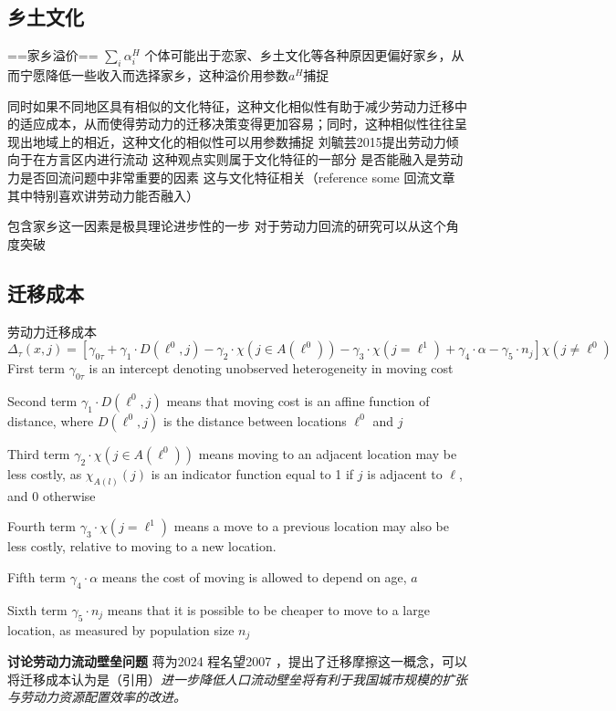 \documentclass[10pt,a4paper]{article}
\begin{document}
\subsection{乡土文化}
==家乡溢价== $\sum\limits_{i}\alpha^{H}_{i}$
个体可能出于恋家、乡土文化等各种原因更偏好家乡，从而宁愿降低一些收入而选择家乡，这种溢价用参数$a^H$捕捉

同时如果不同地区具有相似的文化特征，这种文化相似性有助于减少劳动力迁移中的适应成本，从而使得劳动力的迁移决策变得更加容易；同时，这种相似性往往呈现出地域上的相近，这种文化的相似性可以用参数捕捉
刘毓芸2015提出劳动力倾向于在方言区内进行流动 这种观点实则属于文化特征的一部分
是否能融入是劳动力是否回流问题中非常重要的因素 这与文化特征相关（reference some 回流文章 其中特别喜欢讲劳动力能否融入）

包含家乡这一因素是极具理论进步性的一步 对于劳动力回流的研究可以从这个角度突破

\subsection{迁移成本}
劳动力迁移成本
$$\Delta_\tau(x, j) = [\gamma_{0 \tau}+\gamma_1 \cdot D(\ell^0,j)-\gamma_2 \cdot\chi(j\in A(\ell^0))-\gamma_3 \cdot\chi(j=\ell^1)+\gamma_4 \cdot\alpha-\gamma_5 \cdot n_j]\chi(j\neq \ell^0)$$
First term $\gamma_{0 \tau}$ is an intercept denoting unobserved heterogeneity in moving cost

Second term $\gamma_1 \cdot D(\ell^0,j)$ means that moving cost is an affine function of distance, where $D(\ell^0, j)$ is the distance between locations $\ell^0$ and $j$ 

Third term $\gamma_2 \cdot\chi(j\in A(\ell^0))$ means moving to an adjacent location may be less costly, as $\chi_{A(l)}(j)$ is an indicator function equal to 1 if $j$ is adjacent to $\ell$, and 0 otherwise

Fourth term $\gamma_3 \cdot\chi(j=\ell^1)$ means a move to a previous location may also be less costly, relative to moving to a new location.

Fifth term $\gamma_4 \cdot\alpha$ means the cost of moving is allowed to depend on age, $a$

Sixth term $\gamma_5 \cdot n_j$ means that it is possible to be cheaper to move to a large location, as measured by population size $n_j$

\textbf{讨论劳动力流动壁垒问题}
蒋为2024
程名望2007
\cite{WangLiLiWoGuoRenKouQianYiChengBenChengShiGuiMoYuShengChanLu2020}，\cite{WangLiLiTuDiGongGeiFangJieYuLaoDongLiKongJianPeiZhiXiaoLu2023}提出了迁移摩擦这一概念，可以将迁移成本认为是（引用）\textit{进一步降低人口流动壁垒将有利于我国城市规模的扩张与劳动力资源配置效率的改进。}
\end{document}
